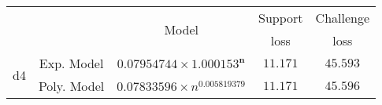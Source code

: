 \begin{tabular}{ccccc} 
\hline 
 &  & \multirow{2}{*}{Model} & Support & Challenge\tabularnewline 
 &  &  & loss  & loss\tabularnewline 
\hline 
\hline 
\multirow{2}{*}{d4} & Exp. Model & $\mathbf{0.07954744\times 1.000153^{n}}$ & $\mathbf{11.171}$ & $\mathbf{45.593}$ \tabularnewline 
 & Poly. Model & $0.07833596\times n^{0.005819379}$ & $11.171$ & $45.596$ \tabularnewline 
\hline 
\end{tabular} 

